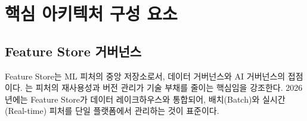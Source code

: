 \section{핵심 아키텍처 구성 요소}
\label{sec:13.3}

\subsection{Feature Store 거버넌스}
\label{sec:13.3.1}

Feature Store는 ML 피처의 중앙 저장소로서, 데이터 거버넌스와 AI 거버넌스의 접점이다. \cite{delarua2024hopsworks}는 피처의 재사용성과 버전 관리가 기술 부채\cite{paleyes2022challenges}를 줄이는 핵심임을 강조한다. 2026년에는 Feature Store가 데이터 레이크하우스와 통합되어, 배치(Batch)와 실시간(Real-time) 피처를 단일 플랫폼에서 관리하는 것이 표준이다.

